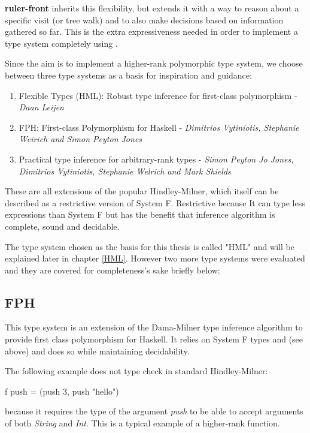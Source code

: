 \textbf{ruler-front} inherits this flexibility, but extends it with a way to reason about a specific visit (or tree walk) and to also make decisions based on information gathered so far. This is the extra expressiveness needed in order to implement a type system completely using \ags.

Since the aim is to implement a higher-rank polymorphic type system, we choose between three type systems as a basis for inspiration and guidance:

\begin{enumerate}
\item Flexible Types (HML): Robust type inference for first-class polymorphism - \textit{Daan Leijen}
\item FPH: First-class Polymorphism for Haskell - \textit{Dimitrios Vytiniotis, Stephanie Weirich and Simon Peyton Jones}
\item Practical type inference for arbitrary-rank types - \textit{Simon Peyton Jo Jones, Dimitrios Vytiniotis, Stephanie Welrich and Mark Shields}
\end{enumerate}

These are all extensions of the popular Hindley-Milner, which itself can be described as a restrictive version of System F. Restrictive because It can type less expressions than System F but has the benefit that inference algorithm is complete, sound and decidable.

The type system chosen as the basis for this thesis is called "HML" and will be explained later in chapter \ref{HML}. However two more type systems were evaluated and they are covered for completeness's sake briefly below:

\subsection{FPH\cite{FPH}}
This type system is an extension of the Dama-Milner type inference algorithm to provide first class polymorphism for Haskell. It relies on System F types and (see above) and does so while maintaining decidability. 

The following example does not type check in standard Hindley-Milner:
\begin{code}
f push = (push 3, push "hello")
\end{code}

because it requires the type of the argument \textit{push} to be able to accept arguments of both \textit{String} and \textit{Int}. This is a typical example of a higher-rank function. 

